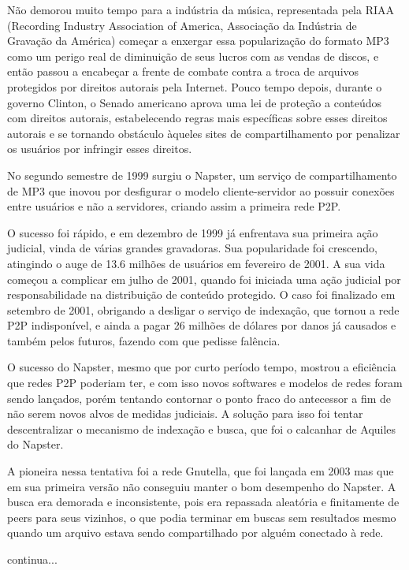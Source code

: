 Não demorou muito tempo para a indústria da música, representada pela RIAA (Recording Industry Association of America, Associação da Indústria de Gravação da América) começar a enxergar essa popularização do formato MP3 como um perigo real de diminuição de seus lucros com as vendas de discos, e então passou a encabeçar a frente de combate contra a troca de arquivos protegidos por direitos autorais pela Internet. Pouco tempo depois, durante o governo Clinton, o Senado americano aprova uma lei de proteção a conteúdos com direitos autorais, estabelecendo regras mais específicas sobre esses direitos autorais e se tornando obstáculo àqueles sites de compartilhamento por penalizar os usuários por infringir esses direitos.

No segundo semestre de 1999 surgiu o Napster, um serviço de compartilhamento de MP3 que inovou por desfigurar o modelo cliente-servidor ao possuir conexões entre usuários e não a servidores, criando assim a primeira rede P2P.

O sucesso foi rápido, e em dezembro de 1999 já enfrentava sua primeira ação judicial, vinda de várias grandes gravadoras. Sua popularidade foi crescendo, atingindo o auge de 13.6 milhões de usuários em fevereiro de 2001. A sua vida começou a complicar em julho de 2001, quando foi iniciada uma ação judicial por responsabilidade na distribuição de conteúdo protegido. O caso foi finalizado em setembro de 2001, obrigando a desligar o serviço de indexação, que tornou a rede P2P indisponível, e ainda a pagar 26 milhões de dólares por danos já causados e também pelos futuros, fazendo com que pedisse falência.

O sucesso do Napster, mesmo que por curto período tempo, mostrou a eficiência que redes P2P poderiam ter, e com isso novos softwares e modelos de redes foram sendo lançados, porém tentando contornar o ponto fraco do antecessor a fim de não serem novos alvos de medidas judiciais. A solução para isso foi tentar descentralizar o mecanismo de indexação e busca, que foi o calcanhar de Aquiles do Napster.

A pioneira nessa tentativa foi a rede Gnutella, que foi lançada em 2003 mas que em sua primeira versão não conseguiu manter o bom desempenho do Napster. A busca era demorada e inconsistente, pois era repassada aleatória e finitamente de peers para seus vizinhos, o que podia terminar em buscas sem resultados mesmo quando um arquivo estava sendo compartilhado por alguém conectado à rede.

continua...

